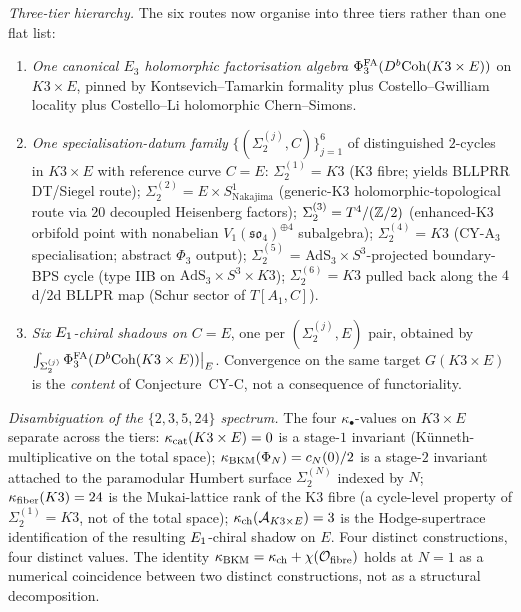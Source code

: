 \emph{Three-tier hierarchy.}  The six routes now organise into three
tiers rather than one flat list:
\begin{enumerate}[label=\textbf{Tier \arabic*.}, leftmargin=*]
 \item \emph{One canonical $E_3$ holomorphic factorisation algebra}
  $\Phi^{\mathrm{FA}}_3(D^b \mathrm{Coh}(K3 \times E))$ on $K3 \times E$, pinned by
  Kontsevich--Tamarkin formality plus Costello--Gwilliam locality
  plus Costello--Li holomorphic Chern--Simons.
 \item \emph{One specialisation-datum family}
  $\{(\Sigma_2^{(j)}, C)\}_{j = 1}^{6}$ of distinguished $2$-cycles
  in $K3 \times E$ with reference curve $C = E$:
  $\Sigma_2^{(1)} = K3$ (K3 fibre; yields BLLPRR DT/Siegel route);
  $\Sigma_2^{(2)} = E \times S^1_{\mathrm{Nakajima}}$ (generic-K3
  holomorphic-topological route via $20$ decoupled Heisenberg factors);
  $\Sigma_2^{(3)} = T^4 / (\mathbb{Z}/2)$ (enhanced-K3 orbifold point with
  nonabelian $V_1(\mathfrak{so}_4)^{\oplus 4}$ subalgebra);
  $\Sigma_2^{(4)} = K3$ (CY-A$_3$ specialisation; abstract
  $\Phi_3$ output); $\Sigma_2^{(5)}$ = AdS$_3 \times S^3$-projected
  boundary-BPS cycle (type IIB on $\mathrm{AdS}_3 \times S^3 \times K3$);
  $\Sigma_2^{(6)} = K3$ pulled back along the $4$d/$2$d BLLPR map
  (Schur sector of $T[A_1, C]$).
 \item \emph{Six $E_1$-chiral shadows on $C = E$}, one per
  $(\Sigma_2^{(j)}, E)$ pair, obtained by
  $\int_{\Sigma_2^{(j)}}\Phi^{\mathrm{FA}}_3(D^b \mathrm{Coh}(K3 \times E))\big|_E$.
  Convergence on the same target $G(K3 \times E)$ is the \emph{content}
  of Conjecture~CY-C, not a consequence of functoriality.
\end{enumerate}

\emph{Disambiguation of the $\{2, 3, 5, 24\}$ spectrum.}  The four
$\kappa_\bullet$-values on $K3 \times E$ separate across the tiers:
$\kappa_{\mathrm{cat}}(K3 \times E) = 0$ is a stage-$1$ invariant
(K\"unneth-multiplicative on the total space);
$\kappa_{\mathrm{BKM}}(\Phi_N) = c_N(0)/2$ is a stage-$2$ invariant attached to the
paramodular Humbert surface $\Sigma_2^{(N)}$ indexed by $N$;
$\kappa_{\mathrm{fiber}}(K3) = 24$ is the Mukai-lattice rank of the K3 fibre (a
cycle-level property of $\Sigma_2^{(1)} = K3$, not of the total space);
$\kappa_{\mathrm{ch}}(\mathcal{A}_{K3 \times E}) = 3$ is the Hodge-supertrace
identification of the resulting $E_1$-chiral shadow on $E$.  Four
distinct constructions, four distinct values.  The identity
$\kappa_{\mathrm{BKM}} = \kappa_{\mathrm{ch}} + \chi(\mathcal{O}_{\mathrm{fibre}})$ holds at $N = 1$ as a
numerical coincidence between two distinct constructions, not as a
structural decomposition.

